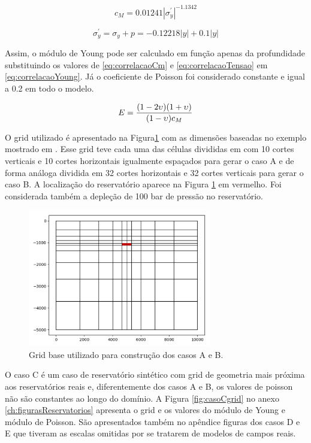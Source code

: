 \begin{equation} \label{eq:correlacaoCm}
    c_M = 0.01241 |\sigma_y^\prime|^{-1.1342}
\end{equation}

\begin{equation} \label{eq:correlacaoTensao}
\sigma_y^\prime = \sigma_y + p = -0.12218|y| + 0.1 |y|
\end{equation}

Assim, o módulo de Young pode ser calculado em função apenas da profundidade substituindo os valores de \eqref{eq:correlacaoCm} e \eqref{eq:correlacaoTensao} em \eqref{eq:correlacaoYoung}. Já o coeficiente de Poisson foi considerado constante e igual a 0.2 em todo o modelo. 

\begin{equation} \label{eq:correlacaoYoung}
    E = \frac{(1-2\upsilon)(1+\upsilon)}{(1-\upsilon)c_M}
\end{equation}

O grid utilizado é apresentado na Figura\ref{fig:gridBase10x10} com as dimensões baseadas no exemplo mostrado em \cite{casteletto}. Esse grid teve cada uma das células divididas em com 10 cortes verticais e 10 cortes horizontais igualmente espaçados para gerar o caso A e de forma análoga dividida em 32 cortes horizontais e 32 cortes verticais para gerar o caso B. A localização do reservatório aparece na Figura \ref{fig:gridBase10x10} em vermelho. Foi considerada também a depleção de 100 bar de pressão no reservatório.

\begin{figure}[!htbp]
    \centering
    \includegraphics[height=6cm]{chap08/figs/Reservoir10x10_grid.png}
    \caption{Grid base utilizado para construção dos casos A e B.}
    \label{fig:gridBase10x10}
\end{figure}


O caso C é um caso de reservatório sintético com grid de geometria mais próxima aos reservatórios reais e,  diferentemente dos casos A e B, os valores de poisson não são constantes ao longo do domínio. A Figura \ref{fig:casoCgrid} no anexo \ref{ch:figurasReservatorios} apresenta o grid e os valores do módulo de Young e módulo de Poisson. São apresentados também no apêndice figuras dos casos D e E que tiveram as escalas omitidas por se tratarem de modelos de campos reais.


